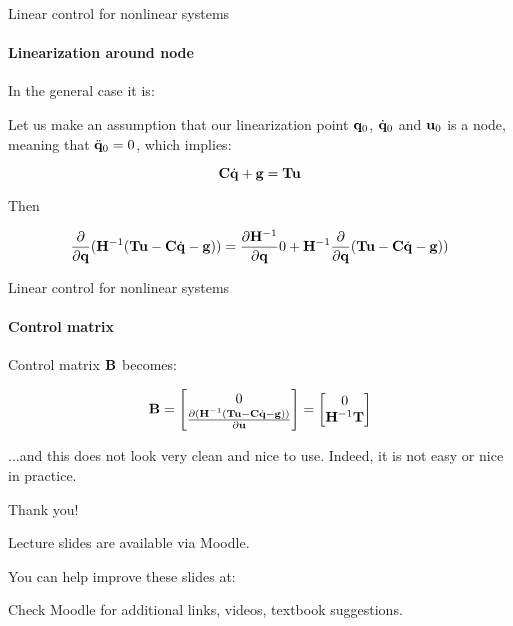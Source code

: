 \documentclass{beamer}
\begin{document}
\begin{frame}{Linear control for nonlinear systems}
	\framesubtitle{Linearization around node}
	\begin{flushleft}
		
		In the general case it is:
	
	Let us make an assumption that our linearization point $\mathbf{q}_0$, $\dot{\mathbf{q}}_0$ and $\mathbf{u}_0$ is a node, meaning that $\ddot{\mathbf{q}}_0 = 0$, which implies:
	
	\begin{equation}
		\mathbf{C} \dot{\mathbf{q}} + \mathbf{g} = \mathbf{T}\mathbf{u}
	\end{equation}

Then 
	
	\begin{equation*}
		\frac{\partial }{\partial \mathbf{q}} (\mathbf{H}^{-1} (\mathbf{T}\mathbf{u} -  \mathbf{C} \dot{\mathbf{q}} - \mathbf{g}) ) 
		= 
		\frac{\partial \mathbf{H}^{-1}}{\partial \mathbf{q}} 0
		+ 
		\mathbf{H}^{-1} 
		\frac{\partial }{\partial \mathbf{q}} 
		(\mathbf{T}\mathbf{u} -  \mathbf{C} \dot{\mathbf{q}} - \mathbf{g}) )
	\end{equation*}
	
	
		
	\end{flushleft}
\end{frame}



\begin{frame}{Linear control for nonlinear systems}
\framesubtitle{Control matrix}
\begin{flushleft}

Control matrix $\mathbf{B}$ becomes:

\begin{equation}
    \mathbf{B} = 
    \begin{bmatrix}
    0\\
    \frac{\partial (\mathbf{H}^{-1} (\mathbf{T}\mathbf{u} -  \mathbf{C} \dot{\mathbf{q}} - \mathbf{g}) )}{\partial \mathbf{u}} 
    \end{bmatrix}
    =
        \begin{bmatrix}
    0\\
    \mathbf{H}^{-1} \mathbf{T}
    \end{bmatrix}
\end{equation}

...and this does not look very clean and nice to use. Indeed, it is not easy or nice in practice.

\end{flushleft}
\end{frame}



\begin{frame}{Thank you!}
	\centerline{Lecture slides are available via Moodle.}
	\bigskip
	\centerline{You can help improve these slides at:}
	\centerline{\mygit}
	\bigskip
	\centerline{Check Moodle for additional links, videos, textbook suggestions.}
	\bigskip
	
	\centerline{\textcolor{black}{}}
\end{frame}
\end{document}
